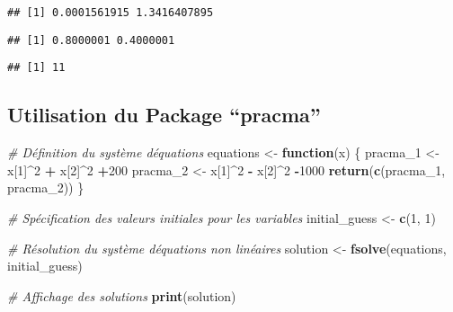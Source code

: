 \documentclass[
]{article}
\newenvironment{Shaded}{\begin{snugshade}}{\end{snugshade}}
\newcommand{\CommentTok}[1]{\textcolor[rgb]{0.56,0.35,0.01}{\textit{#1}}}
\newcommand{\ControlFlowTok}[1]{\textcolor[rgb]{0.13,0.29,0.53}{\textbf{#1}}}
\newcommand{\DecValTok}[1]{\textcolor[rgb]{0.00,0.00,0.81}{#1}}
\newcommand{\DocumentationTok}[1]{\textcolor[rgb]{0.56,0.35,0.01}{\textbf{\textit{#1}}}}
\newcommand{\FunctionTok}[1]{\textcolor[rgb]{0.13,0.29,0.53}{\textbf{#1}}}
\newcommand{\NormalTok}[1]{#1}
\newcommand{\OtherTok}[1]{\textcolor[rgb]{0.56,0.35,0.01}{#1}}
\newcommand{\SpecialCharTok}[1]{\textcolor[rgb]{0.81,0.36,0.00}{\textbf{#1}}}
\begin{document}
\begin{verbatim}
## [1] 0.0001561915 1.3416407895
\end{verbatim}

\begin{Shaded}
\end{Shaded}

\begin{verbatim}
## [1] 0.8000001 0.4000001
\end{verbatim}

\begin{Shaded}
\end{Shaded}

\begin{verbatim}
## [1] 11
\end{verbatim}

\hypertarget{utilisation-du-package-pracma}{%
\subsection{Utilisation du Package
``pracma''}\label{utilisation-du-package-pracma}}

\begin{Shaded}
\begin{Highlighting}[]
\CommentTok{\# Définition du système d\textquotesingle{}équations}
\NormalTok{equations }\OtherTok{\textless{}{-}} \ControlFlowTok{function}\NormalTok{(x) \{}
\NormalTok{  pracma\_1 }\OtherTok{\textless{}{-}}\NormalTok{ x[}\DecValTok{1}\NormalTok{]}\SpecialCharTok{\^{}}\DecValTok{2} \SpecialCharTok{+}\NormalTok{ x[}\DecValTok{2}\NormalTok{]}\SpecialCharTok{\^{}}\DecValTok{2} \SpecialCharTok{+}\DecValTok{200}
\NormalTok{  pracma\_2 }\OtherTok{\textless{}{-}}\NormalTok{ x[}\DecValTok{1}\NormalTok{]}\SpecialCharTok{\^{}}\DecValTok{2} \SpecialCharTok{{-}}\NormalTok{ x[}\DecValTok{2}\NormalTok{]}\SpecialCharTok{\^{}}\DecValTok{2} \SpecialCharTok{{-}}\DecValTok{1000}
  \FunctionTok{return}\NormalTok{(}\FunctionTok{c}\NormalTok{(pracma\_1, pracma\_2))}
\NormalTok{\}}

\CommentTok{\# Spécification des valeurs initiales pour les variables}
\NormalTok{initial\_guess }\OtherTok{\textless{}{-}} \FunctionTok{c}\NormalTok{(}\DecValTok{1}\NormalTok{, }\DecValTok{1}\NormalTok{)}

\CommentTok{\# Résolution du système d\textquotesingle{}équations non linéaires}
\NormalTok{solution }\OtherTok{\textless{}{-}} \FunctionTok{fsolve}\NormalTok{(equations, initial\_guess)}

\CommentTok{\# Affichage des solutions}
\FunctionTok{print}\NormalTok{(solution)}
\end{Highlighting}
\end{Shaded}
\end{document}
